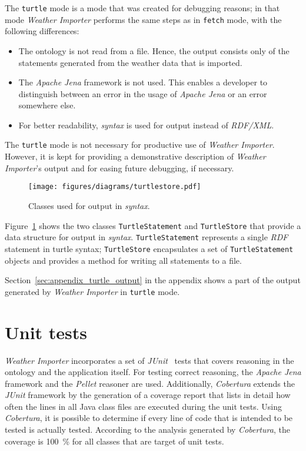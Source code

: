 The \texttt{turtle} mode is a mode that was created for debugging reasons; in that mode \emph{Weather Importer} performs the same steps as in \texttt{fetch} mode, with the following differences:
\begin{itemize}
  \item The \smarthomeweather ontology is not read from a file. Hence, the output consists only of the statements generated from the weather data that is imported.
  \item The \emph{Apache Jena} framework is not used. This enables a developer to distinguish between an error in the usage of \emph{Apache Jena} or an error somewhere else.
  \item For better readability, \emph{ syntax} is used for output instead of \emph{RDF/XML}.
\end{itemize}

The \texttt{turtle} mode is not necessary for productive use of \emph{Weather Importer}. However, it is kept for providing a demonstrative description of \emph{Weather Importer}'s output and for easing future debugging, if necessary.

\begin{figure}
\centering
\texttt{[image: figures/diagrams/turtlestore.pdf]}
\caption[Classes used for output in \emph{ syntax}]{Classes used for output in \emph{ syntax}.}
\label{fig:importer_turtlestore}
\end{figure}

Figure~\ref{fig:importer_turtlestore} shows the two classes \texttt{TurtleStatement} and \texttt{TurtleStore} that provide a data structure for output in \emph{ syntax}. \texttt{TurtleStatement} represents a single \emph{RDF} statement in turtle syntax; \texttt{TurtleStore} encapsulates a set of \texttt{TurtleStatement} objects and provides a method for writing all statements to a file.

Section~\ref{sec:appendix_turtle_output} in the appendix shows a part of the output generated by \emph{Weather Importer} in \texttt{turtle} mode.

\section{Unit tests}
\label{sec:importer_tests}

\emph{Weather Importer} incorporates a set of \emph{JUnit}~\cite{junit} tests that covers reasoning in the \smarthomeweather ontology and the application itself. For testing correct reasoning, the \emph{Apache Jena} framework and the \emph{Pellet} reasoner are used. Additionally, \emph{Cobertura} extends the \emph{JUnit} framework by the generation of a coverage report that lists in detail how often the lines in all Java class files are executed during the unit tests. Using \emph{Cobertura}, it is possible to determine if every line of code that is intended to be tested is actually tested. According to the analysis generated by \emph{Cobertura}, the coverage is \num{100}~\% for all classes that are target of unit tests.

